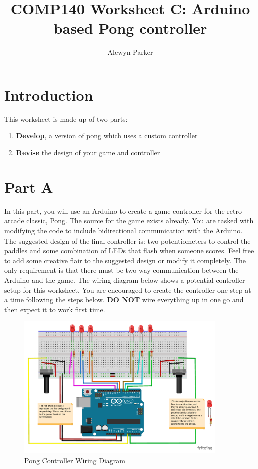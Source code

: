 \documentclass{../../../fal_assignment}
\title{COMP140 Worksheet C: Arduino based Pong controller}
\author{Alcwyn Parker}
\begin{document}
\maketitle

\section*{Introduction}
This worksheet is made up of two parts:

\begin{enumerate}[label=(\Alph*)]
	\item \textbf{Develop}, a version of pong which uses a custom controller
	\item \textbf{Revise} the design of your game and controller 
\end{enumerate}

\section*{Part A}
In this part, you will use an Arduino to create a game controller for the retro arcade classic, Pong. The source for the game exists already. You are tasked with modifying the code to include bidirectional communication with the Arduino. The suggested design of the final controller is: two potentiometers to control the paddles and some combination of LEDs that flash when someone scores. Feel free to add some creative flair to the suggested design or modify it completely. The only requirement is that there must be two-way communication between the Arduino and the game. The wiring diagram below shows a potential controller setup for this worksheet. You are encouraged to create the controller one step at a time following the steps below. \textbf{DO NOT} wire everything up in one go and then expect it to work first time. 

\begin{figure}[!h]
	\begin{center}
		\includegraphics[width=0.9\textwidth]{assets/arduino-pong.pdf}
	\end{center}
	\caption{Pong Controller Wiring Diagram}
	\label{fig:wiring}
\end{figure}
\end{document}

